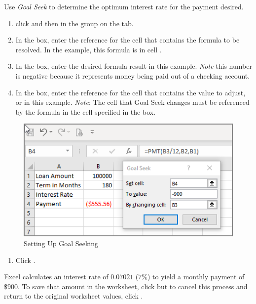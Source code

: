 Use \textit{Goal Seek} to determine the optimum interest rate for the payment desired.

\begin{enumerate}
	\item click  and then  in the  group on the  tab.
	\item In the  box, enter the reference for the cell that contains the formula to be resolved. In the example, this formula is in cell .
	\item In the  box, enter the desired formula result  in this example. \textit{Note} this number is negative because it represents money being paid out of a checking account.
	\item In the  box, enter the reference for the cell that contains the value to adjust, or  in this example. \textit{Note}: The cell that Goal Seek changes must be referenced by the formula in the cell specified in the  box.
	
\end{enumerate}

\begin{figure}[H]
	\centering
	\includegraphics[width=\maxwidth{.95\linewidth}]{gfx/ch08_fig33}
	\caption{Setting Up Goal Seeking}
	\label{08:fig33}
\end{figure}

\begin{enumerate}[resume]	
	\item Click .
\end{enumerate}

Excel calculates an interest rate of $ 0.07021 $ ($ 7\% $) to yield a monthly payment of $ \$900 $. To save that amount in the worksheet, click  but to cancel this process and return to the original worksheet values, click .

